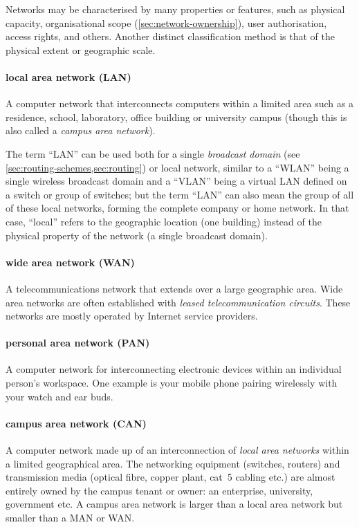 {Networks may be characterised by many properties or features, such as physical capacity, organisational scope (\vref{sec:network-ownership}), user authorisation, access rights, and others.
Another distinct classification method is that of the physical extent or geographic scale.

\paragraph{local area network (LAN)}
A computer network that interconnects computers within a limited area such as a residence, school, laboratory, office building or university campus (though this is also called a \emph{campus area network}).

The term ``LAN'' can be used both for a single \emph{broadcast domain} (see \vref{sec:routing-schemes,sec:routing}) or local network, similar to a ``WLAN'' being a single wireless broadcast domain and a ``VLAN'' being a virtual LAN defined on a switch or group of switches; but the term ``LAN'' can also mean the group of all of these local networks, forming the complete company or home network.
In that case, ``local'' refers to the geographic location (one building) instead of the physical property of the network (a single broadcast domain).

\paragraph{wide area network (WAN)}
A telecommunications network that extends over a large geographic area.
Wide area networks are often established with \emph{leased telecommunication circuits}.
These networks are mostly operated by Internet service providers.

\paragraph{personal area network (PAN)}
A computer network for interconnecting electronic devices within an individual person's workspace.
One example is your mobile phone pairing wirelessly with your watch and ear buds.

\paragraph{campus area network (CAN)}
A computer network made up of an interconnection of \emph{local area networks} within a limited geographical area.
The networking equipment (switches, routers) and transmission media (optical fibre, copper plant, cat~5 cabling etc.) are almost entirely owned by the campus tenant or owner: an enterprise, university, government etc.
A campus area network is larger than a local area network but smaller than a MAN or WAN.

}
